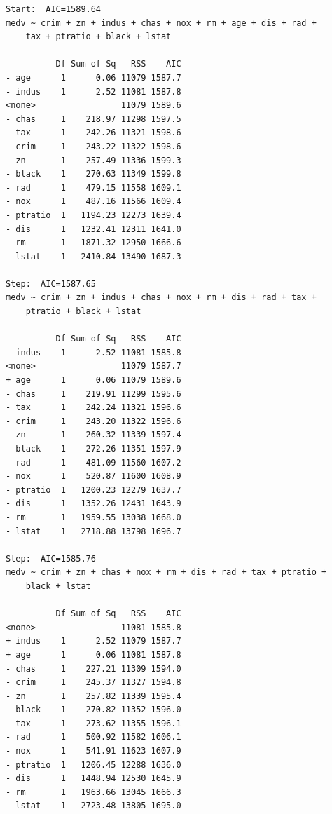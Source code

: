 \documentclass[
  letterpaper,
  DIV=11,
  numbers=noendperiod]{scrreprt}
\begin{document}
\begin{verbatim}
Start:  AIC=1589.64
medv ~ crim + zn + indus + chas + nox + rm + age + dis + rad + 
    tax + ptratio + black + lstat

          Df Sum of Sq   RSS    AIC
- age      1      0.06 11079 1587.7
- indus    1      2.52 11081 1587.8
<none>                 11079 1589.6
- chas     1    218.97 11298 1597.5
- tax      1    242.26 11321 1598.6
- crim     1    243.22 11322 1598.6
- zn       1    257.49 11336 1599.3
- black    1    270.63 11349 1599.8
- rad      1    479.15 11558 1609.1
- nox      1    487.16 11566 1609.4
- ptratio  1   1194.23 12273 1639.4
- dis      1   1232.41 12311 1641.0
- rm       1   1871.32 12950 1666.6
- lstat    1   2410.84 13490 1687.3

Step:  AIC=1587.65
medv ~ crim + zn + indus + chas + nox + rm + dis + rad + tax + 
    ptratio + black + lstat

          Df Sum of Sq   RSS    AIC
- indus    1      2.52 11081 1585.8
<none>                 11079 1587.7
+ age      1      0.06 11079 1589.6
- chas     1    219.91 11299 1595.6
- tax      1    242.24 11321 1596.6
- crim     1    243.20 11322 1596.6
- zn       1    260.32 11339 1597.4
- black    1    272.26 11351 1597.9
- rad      1    481.09 11560 1607.2
- nox      1    520.87 11600 1608.9
- ptratio  1   1200.23 12279 1637.7
- dis      1   1352.26 12431 1643.9
- rm       1   1959.55 13038 1668.0
- lstat    1   2718.88 13798 1696.7

Step:  AIC=1585.76
medv ~ crim + zn + chas + nox + rm + dis + rad + tax + ptratio + 
    black + lstat

          Df Sum of Sq   RSS    AIC
<none>                 11081 1585.8
+ indus    1      2.52 11079 1587.7
+ age      1      0.06 11081 1587.8
- chas     1    227.21 11309 1594.0
- crim     1    245.37 11327 1594.8
- zn       1    257.82 11339 1595.4
- black    1    270.82 11352 1596.0
- tax      1    273.62 11355 1596.1
- rad      1    500.92 11582 1606.1
- nox      1    541.91 11623 1607.9
- ptratio  1   1206.45 12288 1636.0
- dis      1   1448.94 12530 1645.9
- rm       1   1963.66 13045 1666.3
- lstat    1   2723.48 13805 1695.0
\end{verbatim}
\end{document}
